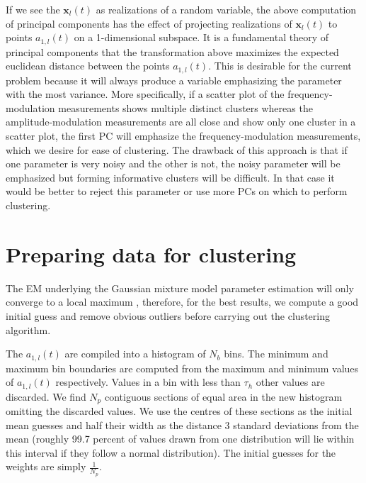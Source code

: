 If we see the $\mathbf{x}_{l}(t)$ as realizations of a random variable, the
above computation of principal components has the effect of projecting
realizations of $\mathbf{x}_{l}(t)$ to points $a_{1,l}(t)$ on a 1-dimensional
subspace. It is a fundamental theory of principal components that the
transformation above maximizes the expected euclidean distance between the
points $a_{1,l}(t)$. This is desirable for the current problem because it will
always produce a variable emphasizing the parameter with the most variance. More
specifically, if a scatter plot of the frequency-modulation measurements shows
multiple distinct clusters whereas the amplitude-modulation measurements are all
close and show only one cluster in a scatter plot, the first PC will emphasize
the frequency-modulation measurements, which we desire for ease of clustering.
The drawback of this approach is that if one parameter is very noisy and the
other is not, the noisy parameter will be emphasized but forming informative
clusters will be difficult. In that case it would be better to reject this
parameter or use more PCs on which to perform clustering.

\section{Preparing data for clustering \label{sec:amfmseppreparecluster}}
The EM underlying the Gaussian mixture model parameter
estimation will only converge to a local maximum \cite{dempster1977maximum},
therefore, for the best results, we compute a good initial guess and remove
obvious outliers before carrying out the clustering algorithm.

The $a_{1,l}(t)$ are compiled into a histogram of $N_{b}$ bins. The minimum and
maximum bin boundaries are computed from the maximum and minimum values of
$a_{1,l}(t)$ respectively. Values in a bin with less than $\tau_{h}$ other
values are discarded. We find $N_{p}$ contiguous sections of equal area in the
new histogram omitting the discarded values.  We use the centres of these
sections as the initial mean guesses and half their width as the distance 3
standard deviations from the mean (roughly 99.7 percent of values drawn from one
distribution will lie within this interval if they follow a normal
distribution). The initial guesses for the weights are simply $\frac{1}{N_{p}}$.

